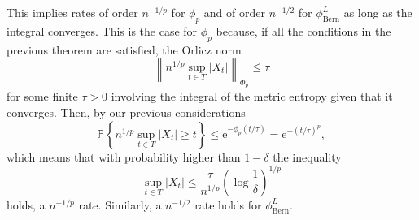 \documentclass{uvamath}
\newcommand*{\calH}{\mathcal{H}}
\newcommand*{\prob}[2][]{\mathbb{P}_{#1}\left\{#2\right\}}
\newcommand*{\paren}[1]{\left(#1\right)}
\newcommand*{\abs}[1]{\left|#1\right|}
\newcommand*{\norm}[1]{\left\lVert#1\right\rVert}
\newcommand*{\rme}{\mathrm{e}}
\theoremstyle{remark}
\theoremstyle{definition}
\theoremstyle{definition}
\theoremstyle{definition}
\theoremstyle{definition}
\theoremstyle{definition}
\begin{document}
\begin{appendices}
This implies rates of order $n^{-1/p}$ for $\phi_p$ and of order
$n^{-1/2}$ for $\phi_{\text{Bern}}^L$ as long as the integral
converges. This is the case for $\phi_p$ because, if all the
conditions in the previous theorem are satisfied, the Orlicz norm
\begin{equation*}
  \norm{n^{1/p}\sup_{t\in T}|X_t|}_{\Phi_p} \leq \tau
\end{equation*}
for some finite $\tau>0$ involving the integral of the metric entropy
given that it converges. Then, by our previous considerations
\begin{equation*}
  \prob{n^{1/p}\sup_{t\in T}|X_t|\geq t}\leq \rme^{-\phi_p(t/\tau)} =
\rme^{-(t/\tau)^{p}},
\end{equation*}
which means that with probability higher than $1-\delta$ the
inequality
\begin{equation*}
  \sup_{t\in T}|X_t| \leq \frac{\tau}{n^{1/p}}\paren{\log\frac{1}{\delta}}^{1/p}
\end{equation*}
holds, a  $n^{-1/p}$ rate. Similarly, a $n^{-1/2}$ rate holds for
$\phi_{\text{Bern}}^L$.



\end{appendices}
\end{document}
